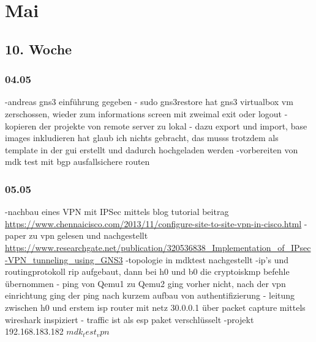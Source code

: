 \documentclass[english,runningheads,a4paper]{llncs}[2018/03/10]
\begin{document}
\section{Mai}
\subsection{10. Woche}
\subsubsection{04.05}
-andreas gns3 einführung gegeben
- sudo gns3restore hat gns3 virtualbox vm zerschossen, wieder zum informations screen mit zweimal exit oder logout
- kopieren der projekte von remote server zu lokal
- dazu export und import, base images inkludieren hat glaub ich nichts gebracht, das musss trotzdem als template in der gui erstellt und dadurch hochgeladen werden
-vorbereiten von mdk test mit bgp ausfallsichere routen
\subsubsection{05.05}
-nachbau eines VPN mit IPSec mittels blog tutorial beitrag \url{https://www.chennaicisco.com/2013/11/configure-site-to-site-vpn-in-cisco.html}
- paper zu vpn gelesen und nachgestellt \url{https://www.researchgate.net/publication/320536838_Implementation_of_IPsec-VPN_tunneling_using_GNS3}
-topologie in mdktest nachgestellt
-ip's und routingprotokoll rip aufgebaut, dann bei h0 und b0 die cryptoiskmp befehle übernommen
- ping von Qemu1 zu Qemu2 ging vorher nicht, nach der vpn einrichtung ging der ping nach kurzem aufbau von authentifizierung 
- leitung zwischen h0 und erstem isp router mit netz 30.0.0.1 über packet capture mittels wireshark inspiziert
- traffic ist als esp paket verschlüsselt
-projekt 192.168.183.182 $mdk_test_vpn$
\end{document}
